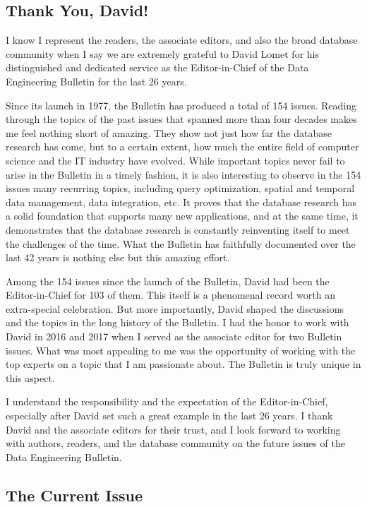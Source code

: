 \documentclass[11pt]{article}
\begin{document}
\subsection*{Thank You, David!}

I know I represent the readers, the associate editors, and also the
broad database community when I say we are extremely grateful to David
Lomet for his distinguished and dedicated service as the
Editor-in-Chief of the Data Engineering Bulletin for the last 26
years.

Since its launch in 1977, the Bulletin has produced a total of 154
issues. Reading through the topics of the past issues that spanned
more than four decades makes me feel nothing short of amazing. They
show not just how far the database research has come, but to a certain
extent, how much the entire field of computer science and the IT
industry have evolved. While important topics never fail to arise in
the Bulletin in a timely fashion, it is also interesting to observe in
the 154 issues many recurring topics, including query optimization,
spatial and temporal data management, data integration, etc. It proves
that the database research has a solid foundation that supports many
new applications, and at the same time, it demonstrates that the
database research is constantly reinventing itself to meet the
challenges of the time. What the Bulletin has faithfully documented
over the last 42 years is nothing else but this amazing effort.

Among the 154 issues since the launch of the Bulletin, David had been
the Editor-in-Chief for 103 of them. This itself is a phenomenal
record worth an extra-special celebration. But more importantly, David
shaped the discussions and the topics in the long history of the
Bulletin.  I had the honor to work with David in 2016 and 2017 when I
served as the associate editor for two Bulletin issues. What was most
appealing to me was the opportunity of working with the top experts on
a topic that I am passionate about. The Bulletin is truly unique in
this aspect.

I understand the responsibility and the expectation of the
Editor-in-Chief, especially after David set such a great example in
the last 26 years. I thank David and the associate editors for their
trust, and I look forward to working with authors, readers, and the
database community on the future issues of the Data Engineering
Bulletin.

\subsection*{The Current Issue}
\end{document}
